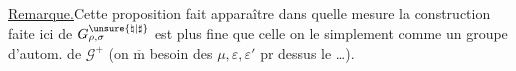 \uline{Remarque.}\quad Cette proposition fait apparaître
dans quelle mesure la  construction faite ici de
$G_{\rho,\sigma}^{\unsure{\natural|\sharp}}$
est plus fine que celle 
on le  simplement comme un
groupe d'autom. de $\mathcal G^+$
(on $\overline{\mathrm m}$  besoin
des $\mu,\varepsilon,\varepsilon'$
pr dessus le \ldots).
